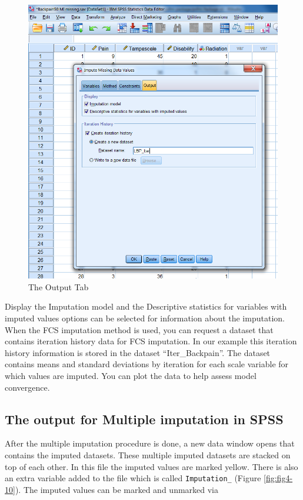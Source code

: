 \documentclass[]{book}
\begin{document}
\begin{figure}

{\centering \includegraphics[width=0.9\linewidth]{images/fig4.9} 

}

\caption{The Output Tab}\label{fig:fig4-9}
\end{figure}

Display the Imputation model and the Descriptive statistics for
variables with imputed values options can be selected for information
about the imputation. When the FCS imputation method is used, you can
request a dataset that contains iteration history data for FCS
imputation. In our example this iteration history information is stored
in the dataset ``Iter\_Backpain''. The dataset contains means and
standard deviations by iteration for each scale variable for which
values are imputed. You can plot the data to help assess model
convergence.

\subsection{The output for Multiple imputation in
SPSS}\label{the-output-for-multiple-imputation-in-spss}

After the multiple imputation procedure is done, a new data window opens
that contains the imputed datasets. These multiple imputed datasets are
stacked on top of each other. In this file the imputed values are marked
yellow. There is also an extra variable added to the file which is
called \texttt{Imputation\_} (Figure \ref{fig:fig4-10}). The imputed
values can be marked and unmarked via
\end{document}
